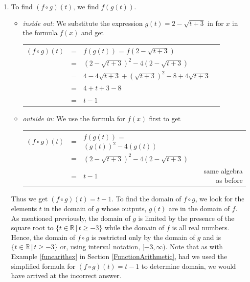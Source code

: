 \documentclass{ximera}
\begin{document}
\begin{example}
\begin{explanation}
\begin{enumerate}
Our solution to $x^2-4x+3 \geq 0$, and hence the domain of $g \circ f$, is $(-\infty, 1] \cup [3,\infty)$.

\item  To find $(f \circ g)(t)$, we find $f(g(t))$. 

\begin{itemize}

\item  \textit{inside out}: We substitute the expression $g(t) = 2 - \sqrt{t+3}$ in for $x$ in the formula $f(x)$ and get 
\begin{longtable}{rclr} $(f \circ g)(t)$ & = & $f(g(t))$ = $f\left(2-\sqrt{t+3}\right)$ & \\  
 & = & $\left(2-\sqrt{t+3}\right)^2 - 4\left(2-\sqrt{t+3}\right)$ & \\  
 & = & $4 - 4\sqrt{t+3} + \left(\sqrt{t+3}\right)^2 - 8 + 4 \sqrt{t+3}$ & \\  
 & = & $4 + t+3 - 8$ & \\ 
 & = & $t-1$ & \\
 \end{longtable}

\item  \textit{outside in}:  We use the formula for $f(x)$ first to get
\begin{longtable}{rclr} $(f \circ g)(t)$ & = & $f(g(t))$ = $\left(g(t)\right)^2 - 4\left(g(t)\right)$& \\  
 & = & $\left(2-\sqrt{t+3}\right)^2 - 4\left(2-\sqrt{t+3}\right)$ & \\  
 & = & $t-1$ & same algebra as before \\
 \end{longtable}

\end{itemize}

Thus we get $(f \circ g)(t) = t-1$.  To find the domain of $f \circ g$, we look for the elements $t$ in the domain of $g$ whose outputs, $g(t)$ are in the domain of $f$.   As mentioned previously, the domain of $g$ is limited by the presence of the square root to  $\{ t \in \mathbb{R} \, | \, t \geq -3\}$  while the domain of $f$ is all real numbers.  Hence,  the domain of $f \circ g$ is restricted only by the domain of $g$ and is $\{ t \in \mathbb{R} \, | \, t \geq -3\}$ or, using interval notation,  $[-3, \infty)$.  Note that as with Example \ref{funcarithex}  in Section \ref{FunctionArithmetic}, had we used the simplified formula for $(f \circ g)(t) = t-1$  to determine domain, we would have arrived at the incorrect answer.


\end{enumerate}
\end{explanation}
\end{example}
\end{document}
